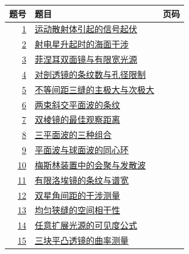 \documentclass[UTF8,fontset=fandol,a4paper,11pt]{ctexart}
\begin{document}
\begin{longtable}{@{}r p{113mm} r@{}}\toprule 题号 & 题目 & 页码\\\midrule

\hyperref[q:1]{1} & \hyperref[q:1]{运动散射体引起的信号起伏} & \pageref{q:1} \\

\hyperref[q:2]{2} & \hyperref[q:2]{射电星升起时的海面干涉} & \pageref{q:2} \\

\hyperref[q:3]{3} & \hyperref[q:3]{菲涅耳双面镜与有限宽光源} & \pageref{q:3} \\

\hyperref[q:4]{4} & \hyperref[q:4]{对剖透镜的条纹数与孔径限制} & \pageref{q:4} \\

\hyperref[q:5]{5} & \hyperref[q:5]{不等间距三缝的主极大与次极大} & \pageref{q:5} \\

\hyperref[q:6]{6} & \hyperref[q:6]{两束斜交平面波的条纹} & \pageref{q:6} \\

\hyperref[q:7]{7} & \hyperref[q:7]{双棱镜的最佳观察距离} & \pageref{q:7} \\

\hyperref[q:8]{8} & \hyperref[q:8]{三平面波的三种组合} & \pageref{q:8} \\

\hyperref[q:9]{9} & \hyperref[q:9]{平面波与球面波的同心环} & \pageref{q:9} \\

\hyperref[q:10]{10} & \hyperref[q:10]{梅斯林装置中的会聚与发散波} & \pageref{q:10} \\

\hyperref[q:11]{11} & \hyperref[q:11]{有限洛埃镜的条纹与谱宽} & \pageref{q:11} \\

\hyperref[q:12]{12} & \hyperref[q:12]{双星角间距的干涉测量} & \pageref{q:12} \\

\hyperref[q:13]{13} & \hyperref[q:13]{均匀狭缝的空间相干性} & \pageref{q:13} \\

\hyperref[q:14]{14} & \hyperref[q:14]{任意扩展光源的可见度公式} & \pageref{q:14} \\

\hyperref[q:15]{15} & \hyperref[q:15]{三块平凸透镜的曲率测量} & \pageref{q:15} \\


\end{longtable}
\end{document}
